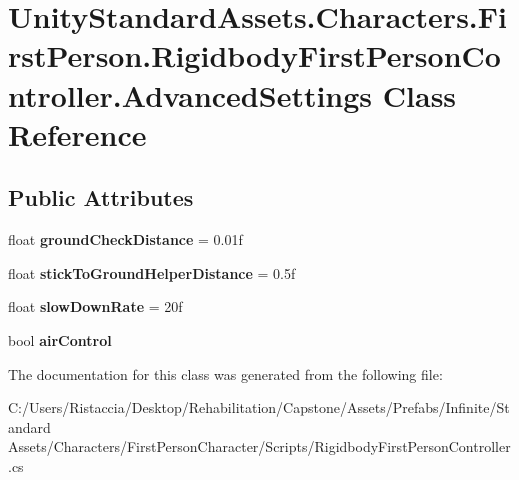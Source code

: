 \hypertarget{class_unity_standard_assets_1_1_characters_1_1_first_person_1_1_rigidbody_first_person_controller_1_1_advanced_settings}{}\section{Unity\+Standard\+Assets.\+Characters.\+First\+Person.\+Rigidbody\+First\+Person\+Controller.\+Advanced\+Settings Class Reference}
\label{class_unity_standard_assets_1_1_characters_1_1_first_person_1_1_rigidbody_first_person_controller_1_1_advanced_settings}
\subsection*{Public Attributes}
\begin{DoxyCompactItemize}
\item 
\mbox{\label{class_unity_standard_assets_1_1_characters_1_1_first_person_1_1_rigidbody_first_person_controller_1_1_advanced_settings_a27942c3ca5d422c0a08e83e4d4405983}} 
float {\bfseries ground\+Check\+Distance} = 0.\+01f
\item 
\mbox{\label{class_unity_standard_assets_1_1_characters_1_1_first_person_1_1_rigidbody_first_person_controller_1_1_advanced_settings_a182c4f372fb40b98e06ad743aac51692}} 
float {\bfseries stick\+To\+Ground\+Helper\+Distance} = 0.\+5f
\item 
\mbox{\label{class_unity_standard_assets_1_1_characters_1_1_first_person_1_1_rigidbody_first_person_controller_1_1_advanced_settings_af92b3ea2c924725b151ddfeeb9922580}} 
float {\bfseries slow\+Down\+Rate} = 20f
\item 
\mbox{\label{class_unity_standard_assets_1_1_characters_1_1_first_person_1_1_rigidbody_first_person_controller_1_1_advanced_settings_ad1ff540811836d721548857f5ccd5dc2}} 
bool {\bfseries air\+Control}
\end{DoxyCompactItemize}


The documentation for this class was generated from the following file\+:\begin{DoxyCompactItemize}
\item 
C\+:/\+Users/\+Ristaccia/\+Desktop/\+Rehabilitation/\+Capstone/\+Assets/\+Prefabs/\+Infinite/\+Standard Assets/\+Characters/\+First\+Person\+Character/\+Scripts/Rigidbody\+First\+Person\+Controller.\+cs\end{DoxyCompactItemize}
